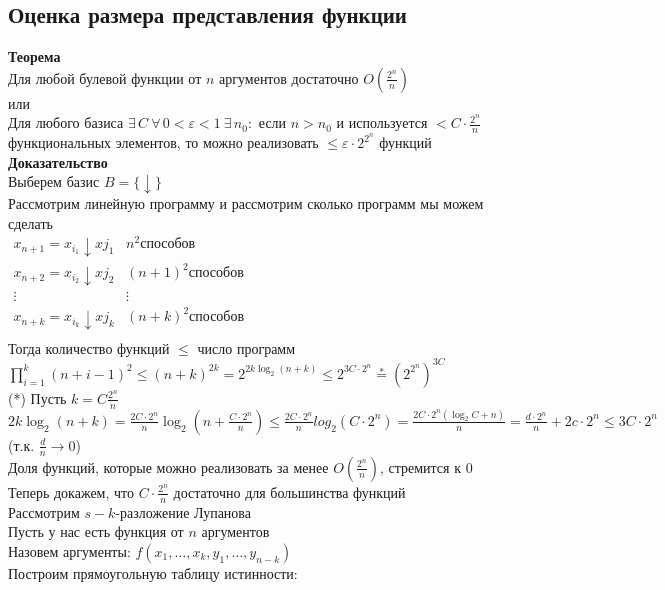\documentclass[12pt]{article}
\begin{document}
\subsection{Оценка размера представления функции}
\textbf{Теорема}\\
Для любой булевой функции от $n$ аргументов достаточно $O(\frac{2^n}n)$\\
или\\
Для любого базиса $\exists\,C\ \forall\,0 < \varepsilon < 1\ \exists\,n_0:$ если $n>n_0$ и используется $<C\cdot\frac {2^n}n$ функциональных элементов, то можно реализовать $\leq \varepsilon\cdot 2^{2^n}$ функций\\
\textbf{Доказательство}\\
Выберем базис $B=\{\downarrow\}$\\
Рассмотрим линейную программу и рассмотрим сколько программ мы можем сделать\\
$\begin{array}{cc}
    x_{n+1}=x_{i_1}\downarrow x{j_1} & n^2 \text{способов}\\
    x_{n+2}=x_{i_2}\downarrow x{j_2} & (n+1)^2 \text{способов}\\
    \vdots & \vdots\\
    x_{n+k}=x_{i_k}\downarrow x{j_k} & (n+k)^2 \text{способов}\\
\end{array}$\\
Тогда количество функций $\leq$ число программ $\prod_{i=1}^k(n+i-1)^2 \leq (n+k)^{2k} = 2^{2k\log_2 (n+k)}\leq 2^{3C\cdot 2^n} \overset{*}{=} (2^{2^n})^{3C}$\\
(*) Пусть $k=C\frac{2^n}{n}$\\
$2k\log_2 (n+k) = \frac{2C\cdot 2^n}{n}\log_2(n+\frac{C\cdot 2^n}{n})\leq \frac{2C\cdot 2^n}{n}log_2(C\cdot 2^n)=\frac{2C\cdot 2^n(\log_2 C+n)}n = \frac{d\cdot 2^n}n+2c\cdot 2^n \leq 3C\cdot 2^n$\\(т.к. $\frac dn \rightarrow 0$)\\
Доля функций, которые можно реализовать за менее $O(\frac {2^n}n)$, стремится к 0\\
Теперь докажем, что $C\cdot \frac{2^n}n$ достаточно для большинства функций\\
Рассмотрим $s-k$-разложение Лупанова\\
Пусть у нас есть функция от $n$ аргументов\\
Назовем аргументы: $f(x_1,\ldots,x_k,y_1,\ldots,y_{n-k})$\\
Построим прямоугольную таблицу истинности:
\end{document}
